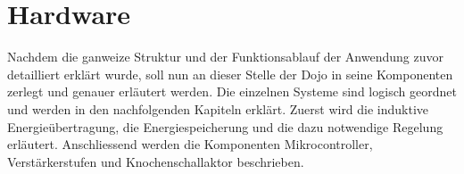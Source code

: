 \section{Hardware}\label{sec:hardware}

Nachdem die ganweize Struktur und der Funktionsablauf der Anwendung zuvor detailliert erklärt wurde, soll nun an dieser Stelle der Dojo in seine Komponenten zerlegt und genauer erläutert werden. Die einzelnen Systeme sind logisch geordnet und werden in den nachfolgenden Kapiteln erklärt. Zuerst wird die induktive Energieübertragung, die Energiespeicherung und die dazu notwendige Regelung erläutert. Anschliessend werden die Komponenten Mikrocontroller, Verstärkerstufen und Knochenschallaktor beschrieben.
